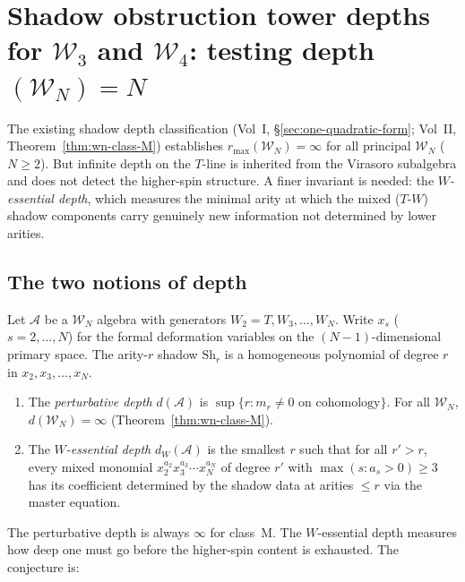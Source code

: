 \documentclass[11pt]{article}
\newcommand{\cA}{\mathcal{A}}
\newcommand{\cW}{\mathcal{W}}
\begin{document}
\section{Shadow obstruction tower depths for $\cW_3$ and $\cW_4$: testing depth$(\cW_N) = N$}
\label{sec:shadow-tower-depths-WN}

The existing shadow depth classification (Vol~I,
\S\ref{sec:one-quadratic-form}; Vol~II,
Theorem~\ref{thm:wn-class-M}) establishes $r_{\max}(\cW_N)
= \infty$ for all principal $\cW_N$ ($N \ge 2$).  But infinite
depth on the $T$-line is inherited from the Virasoro subalgebra
and does not detect the higher-spin structure.  A finer invariant
is needed: the \emph{$W$-essential depth}, which measures the
minimal arity at which the mixed ($T$-$W$) shadow components
carry genuinely new information not determined by lower arities.

\subsection*{The two notions of depth}

\begin{definition}
\label{def:two-depths}
Let $\cA$ be a $\cW_N$ algebra with generators
$W_2 = T, W_3, \ldots, W_N$.  Write $x_s$ ($s = 2, \ldots, N$)
for the formal deformation variables on the $(N{-}1)$-dimensional
primary space.  The arity-$r$ shadow $\mathrm{Sh}_r$ is a
homogeneous polynomial of degree $r$ in $x_2, x_3, \ldots, x_N$.
\begin{enumerate}[label=\textup{(\roman*)}]
\item The \emph{perturbative depth} $d(\cA)$ is $\sup\{r :
  m_r \ne 0 \text{ on cohomology}\}$.  For all $\cW_N$,
  $d(\cW_N) = \infty$ (Theorem~\ref{thm:wn-class-M}).
\item The \emph{$W$-essential depth} $d_W(\cA)$ is the smallest
  $r$ such that for all $r' > r$, every mixed monomial
  $x_2^{a_2} x_3^{a_3} \cdots x_N^{a_N}$ of degree $r'$ with
  $\max(s : a_s > 0) \ge 3$ has its coefficient determined by the
  shadow data at arities $\le r$ via the master equation.
\end{enumerate}
\end{definition}

The perturbative depth is always $\infty$ for class~M.  The
$W$-essential depth measures how deep one must go before the
higher-spin content is exhausted.  The conjecture is:
\end{document}
